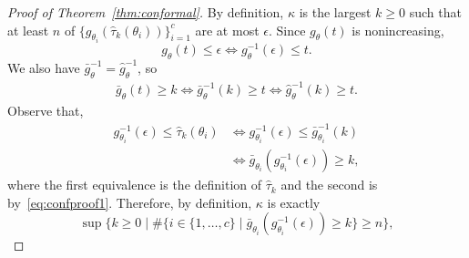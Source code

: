 \documentclass[12pt]{article}
\newtheorem{lemma}[theorem]{Lemma}         %
\theoremstyle{definition}
\theoremstyle{remark}
\newcommand{\bnote}[1]{}
\renewcommand{\bnote}[1]{\textcolor{blue}{\textbf{\small [B: #1]}}}
\newcommand{\param}{\theta}
\newcommand{\cardinality}{\#}
\newcommand{\truegap}{g}
\newcommand{\predgap}{\hat{g}}
\newcommand{\tol}{\epsilon}
\newcommand{\pst}{\hat{\tau}}
\newcommand{\lt}{\kappa}
\newcommand{\ncalib}{c}
\newcommand{\rollmin}{\bar{g}}
\newcommand{\bnote}[1]{}
\renewcommand{\bnote}[1]{\textcolor{blue}{\textbf{\small [B: #1]}}}
\newcommand{\param}{\theta}
\newcommand{\cardinality}{\#}
\newcommand{\truegap}{g}
\newcommand{\predgap}{\hat{g}}
\newcommand{\tol}{\epsilon}
\newcommand{\pst}{\hat{\tau}}
\newcommand{\lt}{\kappa}
\newcommand{\ncalib}{c}
\newcommand{\rollmin}{\bar{g}}
\theoremstyle{plain}
\newtheorem{lemma}[theorem]{Lemma}
\theoremstyle{definition}
\theoremstyle{remark}
\begin{document}
\begin{proof}[Proof of Theorem~\ref{thm:conformal}]
    By definition, $\lt$ is the largest $k \ge 0$ such that at least $n$ of $\{\truegap_{\param_i}(\pst_k(\param_i))\}_{i=1}^\ncalib$ are at most $\tol$.
    Since $\truegap_\param(t)$ is nonincreasing,
    $$
    \truegap_\param(t) \le \tol \iff \truegap_\param^{-1}(\tol) \le t.
    $$
    We also have $\rollmin_\param^{-1} = \predgap_\param^{-1}$, so
    \begin{align}
        \rollmin_\param(t) \ge k \iff \rollmin_\param^{-1}(k) \ge t \iff \predgap_\param^{-1}(k) \ge t. \label{eq:confproof1}
    \end{align}
    Observe that,
    \begin{align*}
    \truegap_{\param_i}^{-1}(\tol) \le \pst_k(\param_i) &\iff \truegap_{\param_i}^{-1}(\tol) \le \rollmin_{\param_i}^{-1}(k) \\&\iff \rollmin_{\param_i}(\truegap_{\param_i}^{-1}(\tol)) \ge k,
    \end{align*}
    where the first equivalence is the definition of $\pst_k$ and the second is by~\eqref{eq:confproof1}.
    Therefore, by definition, $\lt$ is exactly
    \begin{equation*}
        \sup\{k \ge 0 \mid \cardinality\{i \in \{1, \dots, \ncalib\} \mid \rollmin_{\param_i}(\truegap_{\param_i}^{-1}(\tol)) \ge k \} \ge n \},

\end{equation*}
\end{proof}
\end{document}
